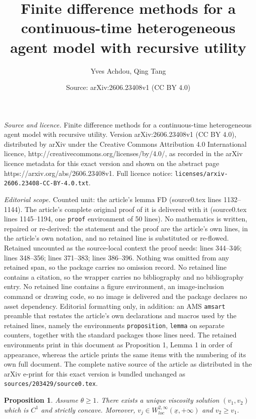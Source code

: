 \documentclass[10pt,a4paper]{amsart}
\title{Finite difference methods for a continuous-time heterogeneous agent model with recursive utility}
\author{Yves Achdou, Qing Tang}
\date{Source: arXiv:2606.23408v1 (CC BY 4.0)}
\newtheorem{proposition}{Proposition}
\newcommand{\ux}{{\underline x}}
\begin{document}
\maketitle

\noindent\emph{Source and licence.} Finite difference methods for a continuous-time heterogeneous agent model with recursive utility. Version arXiv:2606.23408v1 (CC BY 4.0), distributed by arXiv under the Creative Commons Attribution 4.0 International licence, http://creativecommons.org/licenses/by/4.0/, as recorded in the arXiv licence metadata for this exact version and shown on the abstract page https://arxiv.org/abs/2606.23408v1. Full licence notice: \texttt{licenses/arxiv-2606.23408-CC-BY-4.0.txt}.\par\smallskip

\noindent\textit{Editorial scope.} Counted unit: the article's lemma FD (source0.tex lines 1132--1144). The article's complete original proof of it is delivered with it (source0.tex lines 1145--1194, one \texttt{proof} environment of 50 lines). No mathematics is written, repaired or re-derived: the statement and the proof are the article's own lines, in the article's own notation, and no retained line is substituted or re-flowed.  Retained uncounted as the source-local context the proof needs: lines 344--346; lines 348--356; lines 371--383; lines 386--396.  Nothing was omitted from any retained span, so the package carries no omission record.  No retained line contains a citation, so the wrapper carries no bibliography and no bibliography entry.  No retained line contains a figure environment, an image-inclusion command or drawing code, so no image is delivered and the package declares no asset dependency.  Editorial formatting only, in addition: an AMS \texttt{amsart} preamble that restates the article's own declarations and macros used by the retained lines, namely the environments \texttt{proposition}, \texttt{lemma} on separate counters, together with the standard packages those lines need.  The retained environments print in this document as Proposition 1, Lemma 1 in order of appearance, whereas the article prints the same items with the numbering of its own full document.  The complete native source of the article as distributed in the arXiv e-print for this exact version is bundled unchanged as \texttt{sources/203429/source0.tex}.
\begin{proposition}\label{Prop: v sol}
Assume $\theta \geq 1$. There exists a unique viscosity solution $(v_1,v_2)$ which is $C^1$ and strictly concave. Moreover, $v_j\in W^{2,\infty}_{loc}(\ux,+\infty)$ and $v_2\geq v_1$. 
\end{proposition}
\end{document}
